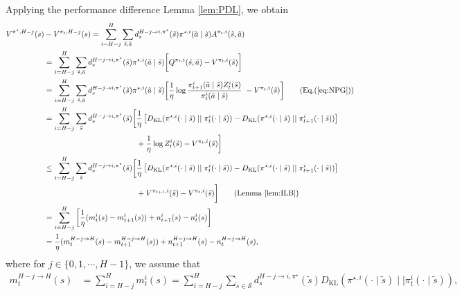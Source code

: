 \documentclass[11pt]{article}
\begin{document}
Applying the performance difference Lemma \ref{lem:PDL}, we obtain
\begin{align*} 
V^{\pi^\star,{H-j}}(s) & - V^{\pi_t,{H-j}}(s) =\sum^H_{i=H-j} \sum_{\tilde{s},\tilde{a}} d^{{H-j} \to i, \pi^\star}_s (\tilde{s})  \pi^{\star,i} (\tilde{a}\mid \tilde{s}) A^{\pi_t,i}(\tilde{s}, \tilde{a}) \\
& = \sum^H_{i=H-j} \sum_{\tilde{s},\tilde{a}} d^{{H-j} \to i, \pi^\star}_s (\tilde{s}) \pi^{\star,i} (\tilde{a}\mid \tilde{s}) \bigg[Q^{\pi_t,i} (\tilde{s}, \tilde{a})-V^{\pi_t,i} (\tilde{s}) \bigg]   \\
& = \sum^H_{i=H-j}  \sum_{\tilde{s},\tilde{a}} d^{{H-j} \to i, \pi^\star}_s (\tilde{s}) \pi^{\star,i} (\tilde{a}\mid \tilde{s}) \bigg[ \frac{1}{\eta}\log \frac{\pi^{i}_{t+1}(\tilde{a}\mid \tilde{s}){Z^{i}_t(\tilde{s})}}{\pi^{i}_t (\tilde{a}\mid \tilde{s})} \ -  V^{\pi_t,i} (\tilde{s}) \bigg]   \tag{Eq.(\ref{eq:NPG})} \\
& =\sum^H_{i=H-j} \sum_{\tilde{s}} d^{{H-j} \to i, \pi^\star}_s (\tilde{s}) \bigg[\frac{1}{\eta} \left[D_{\mathrm{KL}}(\pi^{\star,i}(\cdot \mid\tilde{s}) \mid\mid \pi^{i}_t(\cdot \mid\tilde{s}))-D_{\mathrm{KL}} (\pi^{\star,i}(\cdot \mid\tilde{s}) \mid\mid \pi^{i}_{t+1} (\cdot \mid\tilde{s})) \right] \\ &\quad \quad \quad \quad \quad \quad \quad \quad \quad \quad \quad \quad +\frac{1}{\eta} \log{Z^{i}_t(\tilde{s})}-V^{\pi_t,i} (\tilde{s})\bigg] \\
& \leq \sum^H_{i=H-j} \sum_{\tilde{s}} d^{{H-j} \to i, \pi^\star}_s (\tilde{s})  \bigg[\frac{1}{\eta} \left[D_{\mathrm{KL}}(\pi^{\star,i}(\cdot \mid\tilde{s}) \mid\mid \pi^{i}_t(\cdot \mid\tilde{s}))-D_{\mathrm{KL}}(\pi^{\star,i}(\cdot \mid\tilde{s}) \mid\mid \pi^{i}_{t+1} (\cdot \mid\tilde{s})) \right] \\ &\quad \quad \quad \quad \quad  \quad \quad \quad \quad  \quad \quad \quad + V^{\pi_{t+1},i}(\tilde{s}) - V^{\pi_{t},i}(\tilde{s})\bigg] \tag{Lemma \ref{lem:ILB}}\\
& = \sum^H_{i=H-j} \bigg[ \frac{1}{\eta} (m^{i}_t (s)- {m}^{i}_{t+1} (s)) + n_{t+1}^i (s)-n_{t}^i (s) \bigg]\\
&= \frac{1}{\eta} ( m_t^{H-j\to H} (s)-m_{t+1}^{H-j\to H} (s) ) + n_{t+1}^{H-j\to H} (s)- n_{t}^{H-j\to H} (s),
\end{align*}
where for $j \in \{0,1,\cdots, H-1\}$, we assume that
\begin{align*}
m_t^{H-j\to H} (s) & =\sum^H_{i=H-j} m^i_t (s) = \sum^H_{i=H-j} 
 \sum_{\tilde{s} \in \mathcal{S}} d^{{H-j} \to i, \pi^\star}_s (\tilde{s})  D_{\mathrm{KL}}(\pi^{\star,i} (\cdot \mid\tilde{s}) \mid\mid\pi^i_t (\cdot \mid\tilde{s})),
\end{align*}
\end{document}
